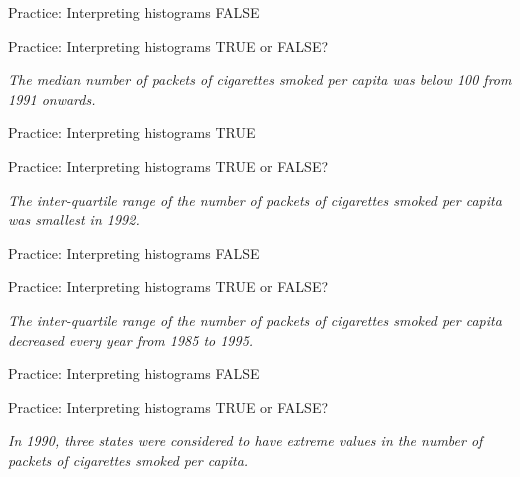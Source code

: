 \documentclass[
  ignorenonframetext,
]{beamer}
\begin{document}
\begin{frame}{Practice: Interpreting histograms}
\label{practice-interpreting-histograms-15}
FALSE
\end{frame}

\begin{frame}{Practice: Interpreting histograms}
\label{practice-interpreting-histograms-16}
TRUE or FALSE?

\emph{The median number of packets of cigarettes smoked per capita was
below 100 from 1991 onwards.}
\end{frame}

\begin{frame}{Practice: Interpreting histograms}
\label{practice-interpreting-histograms-17}
TRUE
\end{frame}

\begin{frame}{Practice: Interpreting histograms}
\label{practice-interpreting-histograms-18}
TRUE or FALSE?

\emph{The inter-quartile range of the number of packets of cigarettes
smoked per capita was smallest in 1992.}
\end{frame}

\begin{frame}{Practice: Interpreting histograms}
\label{practice-interpreting-histograms-19}
FALSE
\end{frame}

\begin{frame}{Practice: Interpreting histograms}
\label{practice-interpreting-histograms-20}
TRUE or FALSE?

\emph{The inter-quartile range of the number of packets of cigarettes
smoked per capita decreased every year from 1985 to 1995.}
\end{frame}

\begin{frame}{Practice: Interpreting histograms}
\label{practice-interpreting-histograms-21}
FALSE
\end{frame}

\begin{frame}{Practice: Interpreting histograms}
\label{practice-interpreting-histograms-22}
TRUE or FALSE?

\emph{In 1990, three states were considered to have extreme values in
the number of packets of cigarettes smoked per capita.}
\end{frame}
\end{document}
